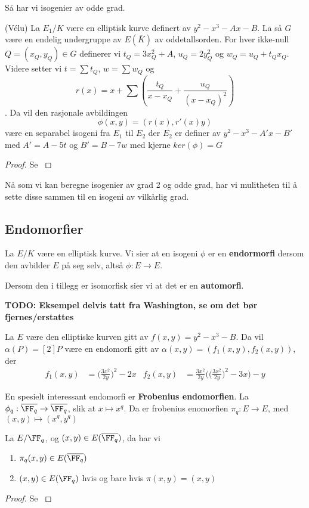 Så har vi isogenier av odde grad. 
\begin{teorem}
(Vélu) \cite{velu} La $E_1/K$ være en elliptisk kurve definert av  $y^2 - x^3 - Ax - B$. La så $G$ være en endelig undergruppe av $E(\overline{K})$ av oddetallsorden. For hver ikke-null $Q = (x_Q, y_Q) \in G$ definerer vi $t_Q = 3x_Q^2 + A$, $u_Q = 2y_Q^2$ og $w_Q = u_Q + t_Qx_Q$. Videre setter vi $t = \sum t_Q$, $w = \sum w_Q$ og $$r(x) = x + \sum (\frac{t_Q}{x - x_Q} + \frac{u_Q}{(x - x_Q)^2})$$. Da vil den rasjonale avbildingen $$ \phi(x,y) = (r(x), r'(x)y)$$ være en separabel isogeni fra $E_1$ til $E_2$ der $E_2$ er definer av $y^2 - x^3 - A'x - B' $ med $A' = A - 5t$ og $B' = B - 7w$ med kjerne $ker(\phi) = G$

\begin{proof}
Se \cite[6.14]{sutherland-notes}
\end{proof}
\end{teorem}

Nå som vi kan beregne isogenier av grad 2 og odde grad, har vi mulitheten til å sette disse sammen til en isogeni av vilkårlig grad.


\subsection{Endomorfier}

\begin{definisjon}
La $E/K$ være en elliptisk kurve. Vi sier at en isogeni $\phi$ er en \textbf{endormorfi }dersom den avbilder $E$ på seg selv, altså $\phi: E \rightarrow E$.

Dersom den i tillegg er isomorfisk sier vi at det er en \textbf{automorfi}.
\end{definisjon}



\textbf{TODO: Eksempel delvis tatt fra Washington, se om det bør fjernes/erstattes}
\begin{eksempel}
\label{enkel_endormorfi}
La $E$ være den elliptiske kurven gitt av $f(x,y) = y^2 - x^3 - B$. Da vil $\alpha(P) = [2]P$ være en endomorfi gitt av $\alpha(x,y) = (f_1(x,y), f_2(x,y))$, der 
\begin{align*}
f_1(x,y) &= \Big(\frac{3x^2}{2y} \Big)^2 - 2x & f_2(x,y) &= \frac{3x^2}{2y}\bigg(\Big(\frac{3x^2}{2y} \Big)^2 - 3x\bigg) - y 
\end{align*}
\end{eksempel}

En spesielt interessant endomorfi er \textbf{Frobenius endomorfien}. La $\phi_q : \overline{\FF_q} \rightarrow \overline{\FF_q}$, slik at $x \mapsto x^q$. Da er frobenius enomorfien $\pi_q: E \rightarrow E$, med $(x,y) \mapsto (x^q, y^q)$

\begin{lemma}
La $E/\FF_q$, og $(x,y) \in E(\overline{\FF_q})$, da har vi \begin{enumerate}
\item $\pi_q(x,y) \in E(\overline{\FF_q})$
\item $(x,y) \in E(\FF_q)$ hvis og bare hvis $\pi(x,y) = (x,y)$
\end{enumerate}

\begin{proof}
Se \cite[93, 4.5]{washington}
\end{proof}
\end{lemma}
